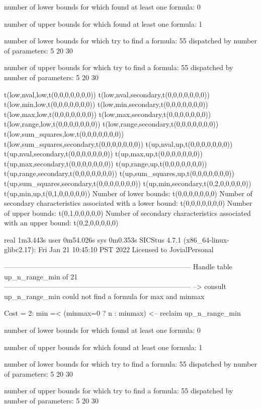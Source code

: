 number of lower bounds for which found at least one formula: 0

number of upper bounds for which found at least one formula: 1

number of lower bounds for which try to find a formula: 55
dispatched by number of parameters: 5  20  30

number of upper bounds for which try to find a formula: 55
dispatched by number of parameters: 5  20  30

t(low,nval,low,t(0,0,0,0,0,0,0))
t(low,nval,secondary,t(0,0,0,0,0,0,0))
t(low,min,low,t(0,0,0,0,0,0,0))
t(low,min,secondary,t(0,0,0,0,0,0,0))
t(low,max,low,t(0,0,0,0,0,0,0))
t(low,max,secondary,t(0,0,0,0,0,0,0))
t(low,range,low,t(0,0,0,0,0,0,0))
t(low,range,secondary,t(0,0,0,0,0,0,0))
t(low,sum_squares,low,t(0,0,0,0,0,0,0))
t(low,sum_squares,secondary,t(0,0,0,0,0,0,0))
t(up,nval,up,t(0,0,0,0,0,0,0))
t(up,nval,secondary,t(0,0,0,0,0,0,0))
t(up,max,up,t(0,0,0,0,0,0,0))
t(up,max,secondary,t(0,0,0,0,0,0,0))
t(up,range,up,t(0,0,0,0,0,0,0))
t(up,range,secondary,t(0,0,0,0,0,0,0))
t(up,sum_squares,up,t(0,0,0,0,0,0,0))
t(up,sum_squares,secondary,t(0,0,0,0,0,0,0))
t(up,min,secondary,t(0,2,0,0,0,0,0))
t(up,min,up,t(0,1,0,0,0,0,0))
Number of lower bounds:                                             t(0,0,0,0,0,0,0)
Number of secondary characteristics associated with a lower bound:  t(0,0,0,0,0,0,0)
Number of upper bounds:                                             t(0,1,0,0,0,0,0)
Number of secondary characteristics associated with an upper bound: t(0,2,0,0,0,0,0)

real	1m3.443s
user	0m54.026s
sys	0m0.353s
SICStus 4.7.1 (x86_64-linux-glibc2.17): Fri Jan 21 10:45:10 PST 2022
Licensed to JovialPersonal


--------------------------------------------------------------------------------
Handle table up_n_range_min of 21
--------------------------------------------------------------------------------
--> consult up_n_range_min
could not find a formula for max and minmax

Cost =  2:  min =< (minmax=0 ? n : minmax)
<-- reclaim up_n_range_min

number of lower bounds for which found at least one formula: 0

number of upper bounds for which found at least one formula: 1

number of lower bounds for which try to find a formula: 55
dispatched by number of parameters: 5  20  30

number of upper bounds for which try to find a formula: 55
dispatched by number of parameters: 5  20  30

